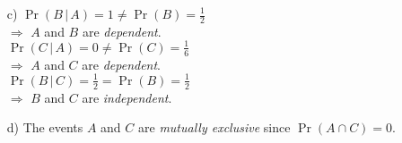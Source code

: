 \documentclass[12pt]{article}
\begin{document}
{\begin{minipage}[t]{0.98\textwidth}
\begin{minipage}[t]{0.47\textwidth}
\begin{enumerate}[]
    We \emph{know} we have $A = $ ``head \& even'' $\Rightarrow$  $C = $ ``die show five'' is \emph{impossible}.\\[0.3cm]
    $\Pr(B\,|\,C) = \frac{1}{2} = \Pr(B)$.\\
    Knowing that the die shows five does not alter our prior probability for $B = $ ``coin shows head''. The die cannot inform us about the coin.\\[0.3cm]
    $\Pr(C\,|\,B) = \frac{1}{6} = \Pr(C)$.\\
    Knowing that the coin shows a head does not alter our prior probability for $C = $ ``die shows a five''. The coin cannot inform us about the die.
\item[c)] $\Pr(B\,|\,A) =  1 \ne \Pr(B) = \frac{1}{2}$\\
$\Rightarrow$ $A$ and $B$ are \emph{dependent}.\\[0.2cm]
$\Pr(C\,|\,A) =  0 \ne \Pr(C) = \frac{1}{6}$\\
$\Rightarrow$ $A$ and $C$ are \emph{dependent}.\\[0.2cm]
$\Pr(B\,|\,C) =  \frac{1}{2} = \Pr(B) = \frac{1}{2}$\\
$\Rightarrow$ $B$ and $C$ are \emph{independent}.
\item[d)] The events $A$ and $C$ are \emph{mutually exclusive} since $\Pr(A \cap C) = 0$.
\end{enumerate}
\end{minipage}
\end{minipage}}\vspace{0.03\textwidth}
\end{document}

